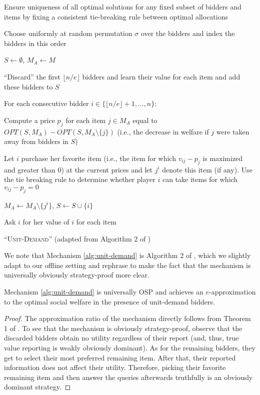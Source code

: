 \begin{algorithm2e}

Ensure uniqueness of all optimal solutions for any fixed subset of bidders and items by fixing a consistent tie-breaking rule between optimal allocations

 Choose uniformly at random permutation $\sigma$ over the bidders and index the bidders in this order

 $S \leftarrow \emptyset$, $M_A \leftarrow M$
  
 ``Discard'' the first $\lfloor n/e \rfloor$ bidders and learn their value for each item and add these bidders to $S$

 For each consecutive bidder $i \in \{\lfloor n/e \rfloor + 1, \dots, n\}$:

    \quad Compute a price $p_j$ for each item $j \in M_A$ equal to $OPT(S, M_A) - OPT(S, M_A \setminus \{j\})$ (i.e., the decrease in welfare if $j$ were taken away from bidders in $S$)

    \quad Let $i$ purchase her favorite item (i.e., the item for which $v_{ij} - p_j$ is maximized and greater than $0$) at the current prices and let $j^i$ denote this item (if any). Use the tie breaking rule to determine whether player $i$ can take items for which $v_{ij}-p_j=0$

    \quad $M_A \leftarrow M_A \setminus \{j^i\}$, $S \leftarrow S \cup \{i\}$

    \quad Ask $i$ for her value of $i$ for each item
 
 \caption{``\textsc{Unit-Demand}'' (adapted from Algorithm 2 of \cite{reiffenhauser2019optimal})}
 \label{alg:unit-demand}
\end{algorithm2e}

We note that Mechanism \ref{alg:unit-demand} is Algorithm 2 of \cite{reiffenhauser2019optimal}, which we slightly adapt to our offline setting and rephrase to make the fact that the mechanism is universally obviously strategy-proof more clear. 


\begin{theorem}\label{thm:ud-upper}
Mechanism \ref{alg:unit-demand} is universally OSP and achieves an $e$-approximation
to the optimal social welfare in the presence of unit-demand bidders.
\end{theorem}
\begin{proof}
The approximation ratio of the mechanism directly follows from Theorem 1 of \cite{reiffenhauser2019optimal}.  To see that the mechanism is obviously strategy-proof, observe that the discarded bidders obtain no utility regardless of their report (and, thus, true value reporting is weakly obviously dominant). As for the remaining bidders, they get to select their most preferred remaining item. After that, their reported information does not affect their utility. Therefore, picking their favorite remaining item and then answer the queries afterwards truthfully is an obviously dominant strategy.   
\end{proof}


